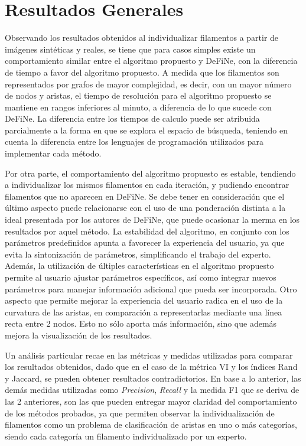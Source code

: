 \section{Resultados Generales}

Observando los resultados obtenidos al individualizar filamentos a partir de im\'agenes sint\'eticas y reales, se tiene que para casos simples existe un comportamiento similar entre el algoritmo propuesto y DeFiNe, con la diferencia de tiempo a favor del algoritmo propuesto. A medida que los filamentos son representados por grafos de mayor complejidad, es decir, con un mayor n\'umero de nodos y aristas, el tiempo de resoluci\'on para el algoritmo propuesto se mantiene en rangos inferiores al minuto, a diferencia de lo que sucede con DeFiNe. La diferencia entre los tiempos de calculo puede ser atribuida parcialmente a la forma en que se explora el espacio de b\'usqueda, teniendo en cuenta la diferencia entre los lenguajes de programaci\'on utilizados para implementar cada m\'etodo. 


Por otra parte, el comportamiento del algoritmo propuesto es estable, tendiendo a individualizar los mismos filamentos en cada iteraci\'on, y pudiendo encontrar filamentos que no aparecen en DeFiNe. Se debe tener en consideraci\'on que el \'ultimo aspecto puede relacionarse con el uso de una ponderaci\'on distinta a la ideal presentada por los autores de DeFiNe, que puede ocasionar la merma en los resultados por aquel m\'etodo. La estabilidad del algoritmo, en conjunto con los par\'ametros predefinidos apunta a favorecer la experiencia del usuario, ya que evita la sintonizaci\'on de par\'ametros, simplificando el trabajo del experto. Adem\'as, la utilizaci\'on de \'ultiples caracter\'isticas en el algoritmo propuesto permite al usuario ajustar par\'ametros espec\'ificos, as\'i como integrar nuevos par\'ametros para manejar informaci\'on adicional que pueda ser incorporada. Otro aspecto que permite mejorar la experiencia del usuario radica en el uso de la curvatura de las aristas, en comparaci\'on a representarlas mediante una l\'inea recta entre 2 nodos. Esto no s\'olo aporta m\'as informaci\'on, sino que adem\'as mejora la visualizaci\'on de los resultados. 

Un an\'alisis particular recae en las m\'etricas y medidas utilizadas para comparar los resultados obtenidos, dado que en el caso de la m\'etrica VI y los \'indices Rand y Jaccard, se pueden obtener resultados contradictorios. En base a lo anterior, las dem\'as medidas utilizadas como {\it Precision}, {\it Recall} y la medida F1 que se deriva de las 2 anteriores, son las que pueden entregar mayor claridad del comportamiento de los m\'etodos probados, ya que permiten observar la individualizaci\'on de filamentos como un problema de clasificaci\'on de aristas en uno o m\'as categor\'ias, siendo cada  categor\'ia un filamento individualizado por un experto.


